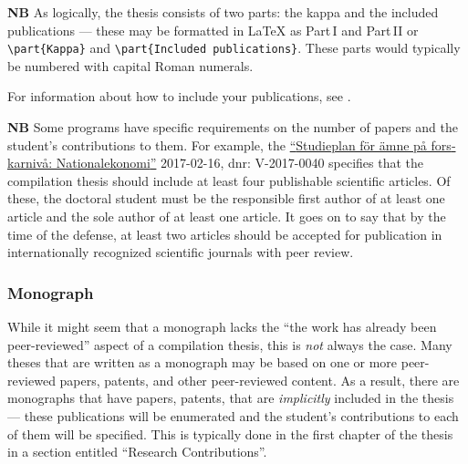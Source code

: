 \documentclass[12pt, twoside]{article}
\begin{document}
\noindent\textbf{NB} As logically, the thesis consists of two parts: the kappa and the included publications --- these may be formatted in \LaTeX{} as Part\,I and Part\,II or \texttt{\textbackslash part\{Kappa\}} and
\texttt{\textbackslash part\{Included publications\}}. These parts would typically be numbered with capital Roman numerals.

For information about how to include your publications, see .
\smallskip

\noindent\textbf{NB} Some programs have specific requirements on the number of papers and the student's contributions to them. For example, the \href{https://www.kth.se/polopoly_fs/1.982602.1588861401!/Nationalekonomi%20ASP%20fastst%C3%A4lld%202017-02-16.pdf}{\enquote{\foreignlanguage{swedish}{Studieplan för ämne på forskarnivå: Nationalekonomi}}} 2017-02-16, dnr: V-2017-0040 specifies that the compilation thesis should include at least four publishable scientific articles. Of these, the doctoral student must be the responsible first author of at least one article and the sole author of at least one article. It goes on to say that by the time of the defense, at least two articles should be accepted for publication in internationally recognized scientific journals with peer review.

\subsubsection{Monograph}
\label{sec:cycle3Monographs}

While it might seem that a monograph lacks the \enquote{the work has already been peer-reviewed} aspect of a compilation thesis, this is \textit{not} always the case. Many theses that are written as a monograph may be based on one or more peer-reviewed papers, patents, and other peer-reviewed content. As a result, there are monographs that have papers, patents, \etc that are \textit{implicitly} included in the thesis --- these publications will be enumerated and the student's contributions to each of them will be specified. This is typically done in the first chapter of the thesis in a section entitled \enquote{Research Contributions}.
\end{document}
